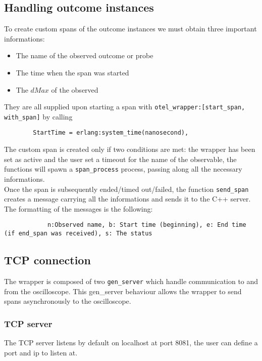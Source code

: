     \subsection{Handling outcome instances}
        To create custom spans of the outcome instances we must obtain three important informations:
        \begin{itemize}
            \item The name of the observed outcome or probe
            \item The time when the span was started
            \item The $dMax$ of the observed
        \end{itemize}
        
        They are all supplied upon starting a span with \texttt{otel\_wrapper:[start\_span, with\_span]} by calling 
        
        \begin{verbatim}
        StartTime = erlang:system_time(nanosecond),
        \end{verbatim}

            The custom span is created only if two conditions are met: the wrapper has been set as active and the user set a timeout for the name of the observable, the functions will spawn a \texttt{span\_process} process, passing along all the necessary informations. \\
        Once the span is subsequently ended/timed out/failed, the function \texttt{send\_span} creates a message carrying all the informations and sends it to the C++ server. The formatting of the messages is the following:
        \begin{verbatim}
            n:Observed name, b: Start time (beginning), e: End time (if end_span was received), s: The status
        \end{verbatim}

    \subsection{TCP connection}
        The wrapper is composed of two \texttt{gen\_server} which handle communication to and from the oscilloscope. This gen\_server behaviour allows the wrapper to send spans asynchronously to the oscilloscope.

        \subsubsection{TCP server}
            The TCP server listens by default on localhost at port 8081, the user can define a port and ip to listen at.

